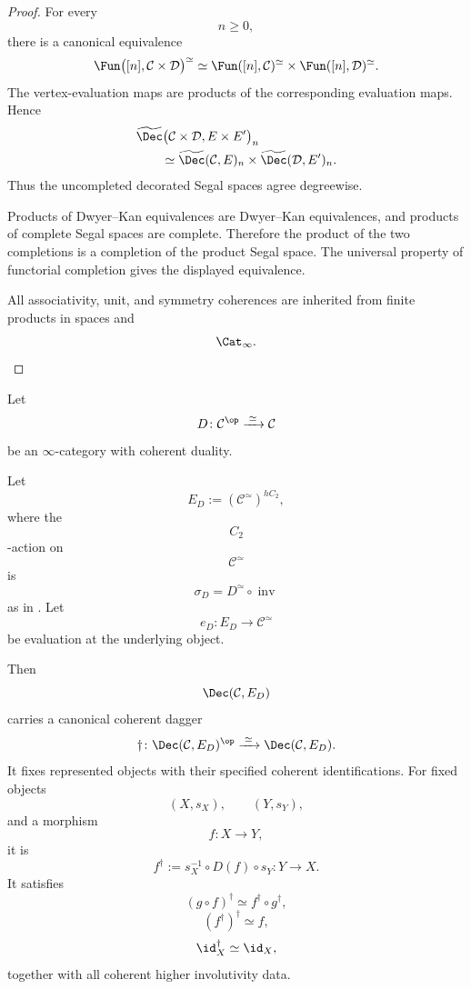 \begin{proof}
For every
\[
    n\geq0,
\]
there is a canonical equivalence
\[
    \Fun
    \bigl(
        [n],
        \mathcal C\times\mathcal D
    \bigr)^\simeq
    \simeq
    \Fun([n],\mathcal C)^\simeq
    \times
    \Fun([n],\mathcal D)^\simeq.
\]
The vertex-evaluation maps are products of the corresponding evaluation
maps. Hence
\[
\begin{aligned}
    &
    \widetilde{\Dec}
    \bigl(
        \mathcal C\times\mathcal D,
        E\times E'
    \bigr)_n
    \\
    &\qquad\simeq
    \widetilde{\Dec}(\mathcal C,E)_n
    \times
    \widetilde{\Dec}(\mathcal D,E')_n.
\end{aligned}
\]
Thus the uncompleted decorated Segal spaces agree degreewise.

Products of Dwyer--Kan equivalences are Dwyer--Kan equivalences, and
products of complete Segal spaces are complete. Therefore the product of
the two completions is a completion of the product Segal space.
The universal property of functorial completion gives the displayed
equivalence.

All associativity, unit, and symmetry coherences are inherited from
finite products in spaces and
\[
    \Cat_\infty.
\]
\end{proof}

\begin{proposition}
\label{prop:fixed-point-decoration-dagger}
Let
\[
    D
    \colon
    \mathcal C^{\op}
    \xrightarrow{\;\simeq\;}
    \mathcal C
\]
be an $\infty$-category with coherent duality.

Let
\[
    E_D
    :=
    (\mathcal C^\simeq)^{hC_2},
\]
where the
\[
    C_2
\]
-action on
\[
    \mathcal C^\simeq
\]
is
\[
    \sigma_D
    =
    D^\simeq\circ\operatorname{inv}
\]
as in
.
Let
\[
    e_D
    \colon
    E_D
    \longrightarrow
    \mathcal C^\simeq
\]
be evaluation at the underlying object.

Then
\[
    \Dec(\mathcal C,E_D)
\]
carries a canonical coherent dagger
\[
    \dagger
    \colon
    \Dec(\mathcal C,E_D)^{\op}
    \xrightarrow{\;\simeq\;}
    \Dec(\mathcal C,E_D).
\]
It fixes represented objects with their specified coherent
identifications. For fixed objects
\[
    (X,s_X),
    \qquad
    (Y,s_Y),
\]
and a morphism
\[
    f
    \colon
    X
    \longrightarrow
    Y,
\]
it is
\[
    f^\dagger
    :=
    s_X^{-1}
    \circ
    D(f)
    \circ
    s_Y
    \colon
    Y
    \longrightarrow
    X.
\]
It satisfies
\[
    (g\circ f)^\dagger
    \simeq
    f^\dagger\circ g^\dagger,
\]
\[
    (f^\dagger)^\dagger
    \simeq
    f,
\]
\[
    \id_X^\dagger
    \simeq
    \id_X,
\]
together with all coherent higher involutivity data.
\end{proposition}

